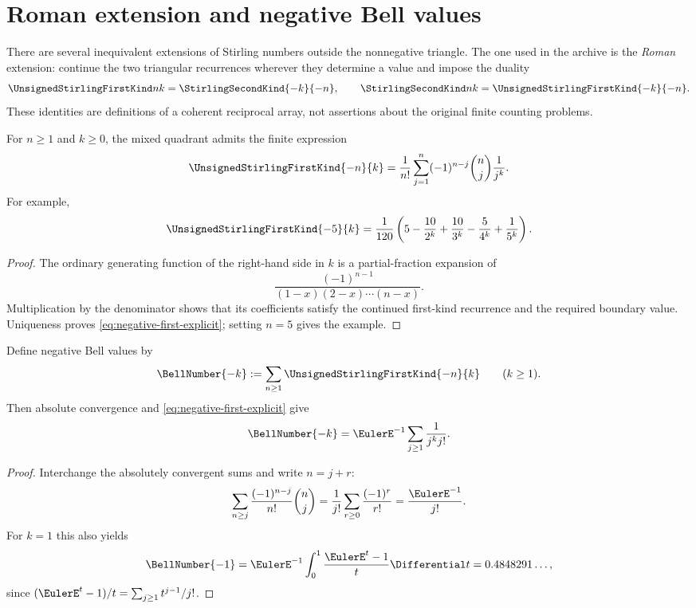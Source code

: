 \documentclass[11pt,a4paper,oneside,openany]{book}
\theoremstyle{definition}
\theoremstyle{remark}
\begin{document}
\section{Roman extension and negative Bell values}
There are several inequivalent extensions of Stirling numbers outside the
nonnegative triangle.  The one used in the archive is the \emph{Roman} extension:
continue the two triangular recurrences wherever they determine a value and impose
the duality
\begin{equation}\label{eq:roman-duality}
 \UnsignedStirlingFirstKind nk=\StirlingSecondKind{-k}{-n},\qquad
 \StirlingSecondKind nk=\UnsignedStirlingFirstKind{-k}{-n}.
\end{equation}
These identities are definitions of a coherent reciprocal array, not assertions
about the original finite counting problems.

For $n\ge1$ and $k\ge0$, the mixed quadrant admits the finite expression
\begin{equation}\label{eq:negative-first-explicit}
 \UnsignedStirlingFirstKind{-n}{k}=\frac1{n!}\sum_{j=1}^n(-1)^{n-j}\binom nj\frac1{j^k}.
\end{equation}
For example,
\begin{equation}\label{eq:negative-first-five}
 \UnsignedStirlingFirstKind{-5}{k}=\frac1{120}
 \left(5-\frac{10}{2^k}+\frac{10}{3^k}-\frac5{4^k}+\frac1{5^k}\right).
\end{equation}
\begin{proof}
The ordinary generating function of the right-hand side in $k$ is a partial-fraction
expansion of
\[
 \frac{(-1)^{n-1}}{(1-x)(2-x)\cdots(n-x)}.
\]
Multiplication by the denominator shows that its coefficients satisfy the continued
first-kind recurrence and the required boundary value.  Uniqueness proves
\cref{eq:negative-first-explicit}; setting $n=5$ gives the example.
\end{proof}

Define negative Bell values by
\begin{equation}\label{eq:negative-bell-def}
 \BellNumber{-k}:=\sum_{n\ge1}\UnsignedStirlingFirstKind{-n}{k}\qquad(k\ge1).
\end{equation}
Then absolute convergence and \cref{eq:negative-first-explicit} give
\begin{equation}\label{eq:negative-dobinski}
 \BellNumber{-k}=\EulerE^{-1}\sum_{j\ge1}\frac1{j^k j!}.
\end{equation}
\begin{proof}
Interchange the absolutely convergent sums and write $n=j+r$:
\[
 \sum_{n\ge j}\frac{(-1)^{n-j}}{n!}\binom nj
 =\frac1{j!}\sum_{r\ge0}\frac{(-1)^r}{r!}=\frac{\EulerE^{-1}}{j!}.
\]
For $k=1$ this also yields
\[
 \BellNumber{-1}=\EulerE^{-1}\int_0^1\frac{\EulerE^t-1}{t}\Differential t
 =0.4848291\ldots,
\]
since $(\EulerE^t-1)/t=\sum_{j\ge1}t^{j-1}/j!$.
\end{proof}
\end{document}
